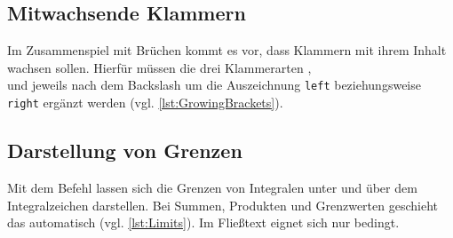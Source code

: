 \begin{table}[H]
\end{table}

\subsection{Mitwachsende Klammern}

Im Zusammenspiel mit Brüchen kommt es vor, dass Klammern mit ihrem Inhalt wachsen sollen.
Hierfür müssen die drei Klammerarten \texttt{\(\)}, \texttt{\[\]} und \texttt{\lbrace\rbrace} jeweils nach dem Backslash um die Auszeichnung \texttt{left} beziehungsweise \texttt{right} ergänzt werden (vgl. \cref{lst:GrowingBrackets}).


\subsection{Darstellung von Grenzen}

Mit dem Befehl \texttt{\limits} lassen sich die Grenzen von Integralen unter und über dem Integralzeichen darstellen.
Bei Summen, Produkten und Grenzwerten geschieht das automatisch (vgl. \cref{lst:Limits}).
Im Fließtext eignet sich \texttt{\limits} nur bedingt.

